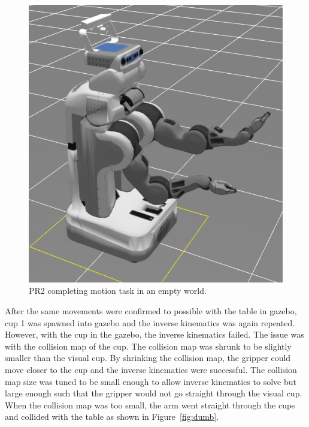 \documentclass[letterpaper, 10 pt, conference]{ieeeconf}  %
\begin{document}
\begin{figure}[thpb]
      \centering
	  \includegraphics[scale =0.15]{pr2_empty_world}
      \caption{PR2 completing motion task in an empty world.}
      \label{fig:empty}
\end{figure}

After the same movements were confirmed to possible with the table in gazebo, cup 1 was spawned into gazebo and the inverse kinematics was again repeated. However, with the cup in the gazebo, the inverse kinematics failed. The issue was with the collision map of the cup. The collision map was shrunk to be slightly smaller than the visual cup. By shrinking the collision map, the gripper could move closer to the cup and the inverse kinematics were successful. The collision map size was tuned to be small enough to allow inverse kinematics to solve but large enough such that the gripper would not go straight through the visual cup. When the collision map was too small, the arm went straight through the cups and collided with the table as shown in Figure~\ref{fig:dumb}.
\end{document}
